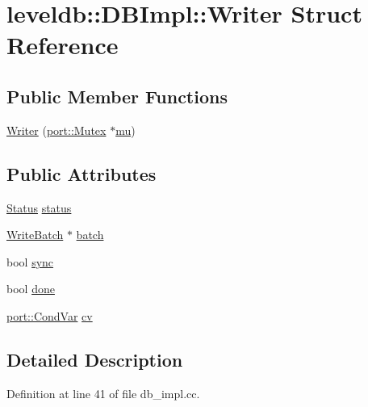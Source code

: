 \hypertarget{structleveldb_1_1_d_b_impl_1_1_writer}{}\section{leveldb\+:\+:D\+B\+Impl\+:\+:Writer Struct Reference}
\label{structleveldb_1_1_d_b_impl_1_1_writer}
\subsection*{Public Member Functions}
\begin{DoxyCompactItemize}
\item 
\hyperlink{structleveldb_1_1_d_b_impl_1_1_writer_a7dfb43a804e1ded7a2a85b3bc756ea93}{Writer} (\hyperlink{classleveldb_1_1port_1_1_mutex}{port\+::\+Mutex} $\ast$\hyperlink{db__impl_8cc_a900dad9ea326bf70a183d88a8ab50a13}{mu})
\end{DoxyCompactItemize}
\subsection*{Public Attributes}
\begin{DoxyCompactItemize}
\item 
\hyperlink{classleveldb_1_1_status}{Status} \hyperlink{structleveldb_1_1_d_b_impl_1_1_writer_af3b0436a99d2679c0e0ac9f6e1fefa37}{status}
\item 
\hyperlink{classleveldb_1_1_write_batch}{Write\+Batch} $\ast$ \hyperlink{structleveldb_1_1_d_b_impl_1_1_writer_ada051134318411635892f0a7d17cb7c0}{batch}
\item 
bool \hyperlink{structleveldb_1_1_d_b_impl_1_1_writer_acb39717e1fa61127f262b474e18ec9f6}{sync}
\item 
bool \hyperlink{structleveldb_1_1_d_b_impl_1_1_writer_afc6025afd873f82252cb563687bd3106}{done}
\item 
\hyperlink{classleveldb_1_1port_1_1_cond_var}{port\+::\+Cond\+Var} \hyperlink{structleveldb_1_1_d_b_impl_1_1_writer_aacb835eedc44855a7c223fca024c5ac4}{cv}
\end{DoxyCompactItemize}


\subsection{Detailed Description}


Definition at line 41 of file db\+\_\+impl.\+cc.



